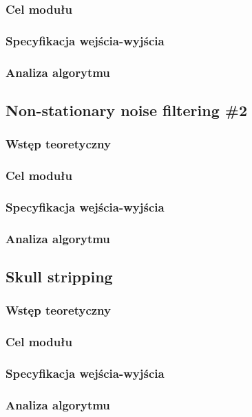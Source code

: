 \documentclass[12]{article}
\begin{document}
		\subsubsection{Cel modułu}
		\subsubsection{Specyfikacja wejścia-wyjścia}
		\subsubsection{Analiza algorytmu}
		\newpage
	\subsection{Non-stationary noise filtering \#2}
		\subsubsection{Wstęp teoretyczny}
		\subsubsection{Cel modułu}
		\subsubsection{Specyfikacja wejścia-wyjścia}
		\subsubsection{Analiza algorytmu}
		\newpage
	\subsection{Skull stripping}
		\subsubsection{Wstęp teoretyczny}
		\subsubsection{Cel modułu}
		\subsubsection{Specyfikacja wejścia-wyjścia}
		\subsubsection{Analiza algorytmu}
		\newpage
\end{document}
